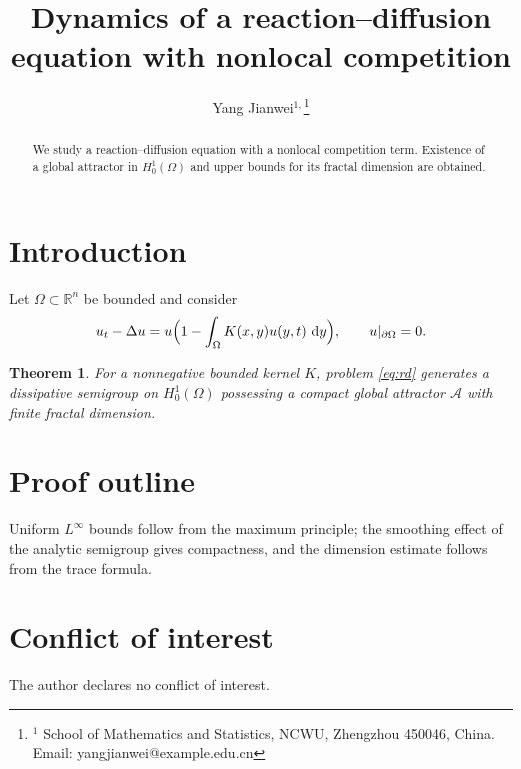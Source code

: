 \documentclass{aimsart}
\def\YTfallback{1}
\newcommand{\shorttitle}[1]{}
\newcommand{\keyword}[1]{}
\newcommand{\msc}[1]{}
\newcommand{\received}[1]{}
\newcommand{\accepted}[1]{}
\newtheorem{theorem}{Theorem}[section]
\newcommand{\R}{\mathbb{R}}
\newcommand{\Om}{\Omega}
\newcommand{\dd}{\,\mathrm{d}}
\begin{document}
\title{Dynamics of a reaction--diffusion equation with nonlocal competition}
\author{Yang Jianwei$^{1,}$\thanks{$^{1}$ School of Mathematics and Statistics, NCWU, Zhengzhou 450046, China. Email: yangjianwei@example.edu.cn}}
\shorttitle{Nonlocal reaction--diffusion dynamics}
\keyword{Reaction--diffusion; nonlocal competition; global attractor; traveling wave}
\msc{35K57, 35B40, 37L30}
\received{January 1, 2026}
\accepted{March 1, 2026}

\begin{abstract}
We study a reaction--diffusion equation with a nonlocal competition
term. Existence of a global attractor in $H^1_0(\Om)$ and upper bounds
for its fractal dimension are obtained.
\end{abstract}

\maketitle

\ifdefined\YTfallback
\noindent{}
\bigskip
\fi

\section{Introduction}

Let $\Om\subset\R^n$ be bounded and consider
\begin{equation}\label{eq:rd}
  u_t - \Delta u = u\Bigl(1 - \int_\Om K(x,y)u(y,t)\,\dd y\Bigr),
  \qquad u|_{\partial\Om}=0 .
\end{equation}

\begin{theorem}
For a nonnegative bounded kernel $K$, problem \eqref{eq:rd} generates a
dissipative semigroup on $H^1_0(\Om)$ possessing a compact global
attractor $\mathcal{A}$ with finite fractal dimension.
\end{theorem}

\section{Proof outline}
Uniform $L^\infty$ bounds follow from the maximum principle; the
smoothing effect of the analytic semigroup gives compactness, and the
dimension estimate follows from the trace formula.

\section*{Conflict of interest}
The author declares no conflict of interest.
\end{document}
